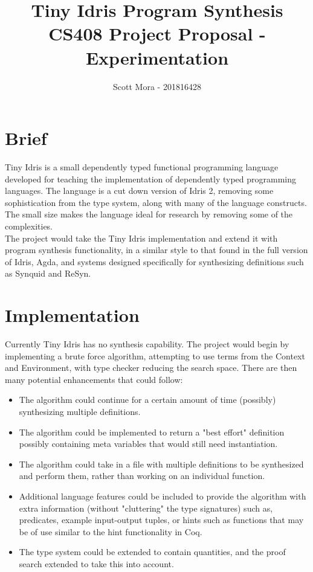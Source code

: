 \documentclass[a4paper]{article}
\author{Scott Mora - 201816428}
\date{}
\title{Tiny Idris Program Synthesis\\\medskip
\large CS408 Project Proposal - Experimentation}
\begin{document}
\maketitle

\section{Brief}
\label{sec:org419453e}

Tiny Idris is a small dependently typed functional programming language developed for teaching the implementation of dependently 
typed programming languages. The language is a cut down version of Idris 2, removing some sophistication from the type system, along 
with many of the language constructs. The small size makes the language ideal for research by removing some of the complexities. \\

The project would take the Tiny Idris implementation and extend it with program synthesis functionality, in
a similar style to that found in the full version of Idris, Agda, and systems designed specifically for 
synthesizing definitions such as Synquid and ReSyn.

\section{Implementation}
\label{sec:org45a9da5}

Currently Tiny Idris has no synthesis capability. The project would begin by implementing a brute force algorithm, 
attempting to use terms from the Context and Environment, with type checker reducing the search space.
There are then many potential enhancements that could follow:\\

\begin{itemize}
\item The algorithm could continue for a certain amount of time (possibly) synthesizing multiple definitions.

\item The algorithm could be implemented to return a "best effort" definition possibly containing meta variables that 
would still need instantiation.

\item The algorithm could take in a file with multiple definitions to be synthesized and perform them, rather than working on 
an individual function.

\item Additional language features could be included to provide the algorithm with extra information (without "cluttering" the type signatures) such as,
predicates, example input-output tuples, or hints such as functions that may be of use similar to the hint functionality in Coq.

\item The type system could be extended to contain quantities, and the proof search extended to take this into account.
\end{itemize}
\end{document}
